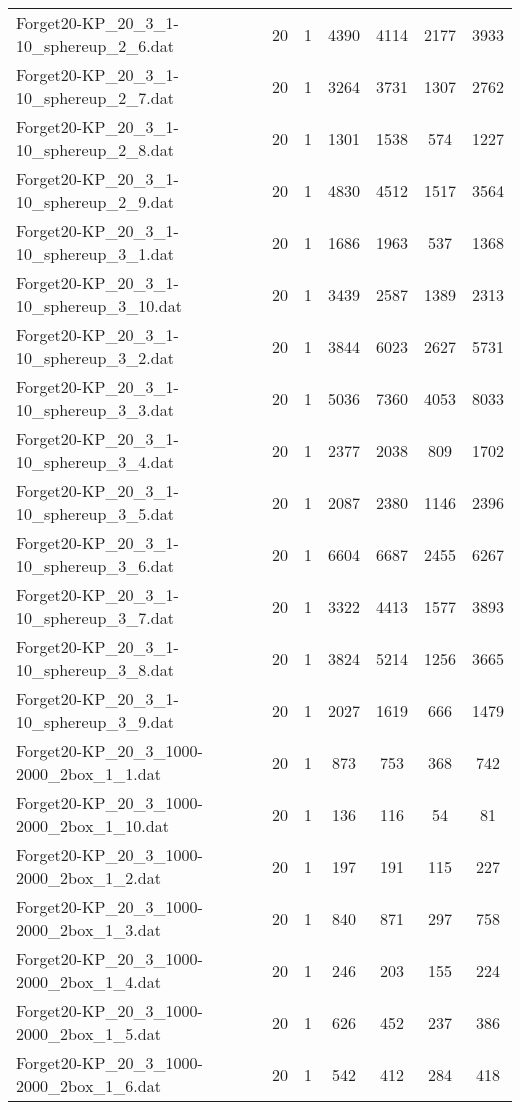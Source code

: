 \begin{table}[!ht]
\begin{tabular}{lcccccc}
Forget20-KP\_20\_3\_1-10\_sphereup\_2\_6.dat & 20 & 1 & 4390 & 4114 & 2177 & 3933 \\
Forget20-KP\_20\_3\_1-10\_sphereup\_2\_7.dat & 20 & 1 & 3264 & 3731 & 1307 & 2762 \\
Forget20-KP\_20\_3\_1-10\_sphereup\_2\_8.dat & 20 & 1 & 1301 & 1538 & 574 & 1227 \\
Forget20-KP\_20\_3\_1-10\_sphereup\_2\_9.dat & 20 & 1 & 4830 & 4512 & 1517 & 3564 \\
Forget20-KP\_20\_3\_1-10\_sphereup\_3\_1.dat & 20 & 1 & 1686 & 1963 & 537 & 1368 \\
Forget20-KP\_20\_3\_1-10\_sphereup\_3\_10.dat & 20 & 1 & 3439 & 2587 & 1389 & 2313 \\
Forget20-KP\_20\_3\_1-10\_sphereup\_3\_2.dat & 20 & 1 & 3844 & 6023 & 2627 & 5731 \\
Forget20-KP\_20\_3\_1-10\_sphereup\_3\_3.dat & 20 & 1 & 5036 & 7360 & 4053 & 8033 \\
Forget20-KP\_20\_3\_1-10\_sphereup\_3\_4.dat & 20 & 1 & 2377 & 2038 & 809 & 1702 \\
Forget20-KP\_20\_3\_1-10\_sphereup\_3\_5.dat & 20 & 1 & 2087 & 2380 & 1146 & 2396 \\
Forget20-KP\_20\_3\_1-10\_sphereup\_3\_6.dat & 20 & 1 & 6604 & 6687 & 2455 & 6267 \\
Forget20-KP\_20\_3\_1-10\_sphereup\_3\_7.dat & 20 & 1 & 3322 & 4413 & 1577 & 3893 \\
Forget20-KP\_20\_3\_1-10\_sphereup\_3\_8.dat & 20 & 1 & 3824 & 5214 & 1256 & 3665 \\
Forget20-KP\_20\_3\_1-10\_sphereup\_3\_9.dat & 20 & 1 & 2027 & 1619 & 666 & 1479 \\
Forget20-KP\_20\_3\_1000-2000\_2box\_1\_1.dat & 20 & 1 & 873 & 753 & 368 & 742 \\
Forget20-KP\_20\_3\_1000-2000\_2box\_1\_10.dat & 20 & 1 & 136 & 116 & 54 & 81 \\
Forget20-KP\_20\_3\_1000-2000\_2box\_1\_2.dat & 20 & 1 & 197 & 191 & 115 & 227 \\
Forget20-KP\_20\_3\_1000-2000\_2box\_1\_3.dat & 20 & 1 & 840 & 871 & 297 & 758 \\
Forget20-KP\_20\_3\_1000-2000\_2box\_1\_4.dat & 20 & 1 & 246 & 203 & 155 & 224 \\
Forget20-KP\_20\_3\_1000-2000\_2box\_1\_5.dat & 20 & 1 & 626 & 452 & 237 & 386 \\
Forget20-KP\_20\_3\_1000-2000\_2box\_1\_6.dat & 20 & 1 & 542 & 412 & 284 & 418 \\

\end{tabular}
\end{table}
